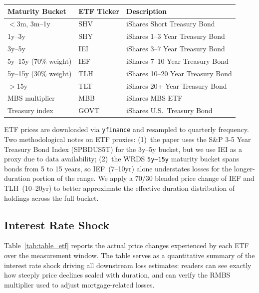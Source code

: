 \documentclass[12pt]{article}
\begin{document}
\begin{center}
\begin{tabular}{lll}
\toprule
Maturity Bucket & ETF Ticker & Description \\
\midrule
$<$3m, 3m--1y          & SHV  & iShares Short Treasury Bond \\
1y--3y                 & SHY  & iShares 1--3 Year Treasury Bond \\
3y--5y                 & IEI  & iShares 3--7 Year Treasury Bond \\
5y--15y (70\% weight)  & IEF  & iShares 7--10 Year Treasury Bond \\
5y--15y (30\% weight)  & TLH  & iShares 10--20 Year Treasury Bond \\
$>$15y                 & TLT  & iShares 20+ Year Treasury Bond \\
MBS multiplier         & MBB  & iShares MBS ETF \\
Treasury index         & GOVT & iShares U.S.\ Treasury Bond \\
\bottomrule
\end{tabular}
\end{center}

ETF prices are downloaded via \texttt{yfinance} and resampled to quarterly
frequency. Two methodological notes on ETF proxies: (1)~the paper uses the
S\&P 3-5 Year Treasury Bond Index (SPBDUS5T) for the 3y--5y bucket, but we
use IEI as a proxy due to data availability; (2)~the WRDS \texttt{5y--15y}
maturity bucket spans bonds from 5 to 15 years, so IEF~(7--10yr) alone
understates losses for the longer-duration portion of the range.  We apply a
70/30 blended price change of IEF and TLH~(10--20yr) to better approximate
the effective duration distribution of holdings across the full bucket.

\subsection{Interest Rate Shock}

Table~\ref{tab:table_etf} reports the actual price changes experienced by
each ETF over the measurement window.  The table serves as a quantitative
summary of the interest rate shock driving all downstream loss estimates:
readers can see exactly how steeply price declines scaled with duration,
and can verify the RMBS multiplier used to adjust mortgage-related losses.

\clearpage


\end{document}
